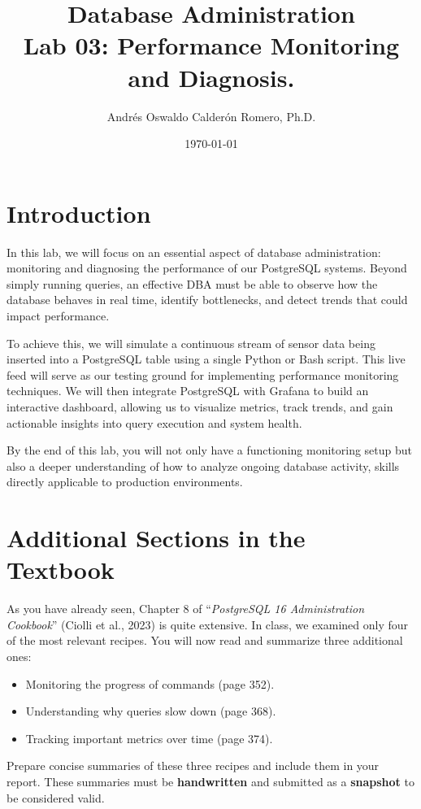 \documentclass{article}
\title{Database Administration \\ Lab 03: Performance Monitoring and Diagnosis.}
\author{Andrés Oswaldo Calderón Romero, Ph.D.}
\date{\today}
\begin{document}
\maketitle

\section{Introduction}
In this lab, we will focus on an essential aspect of database administration: monitoring and diagnosing the performance of our PostgreSQL systems. Beyond simply running queries, an effective DBA must be able to observe how the database behaves in real time, identify bottlenecks, and detect trends that could impact performance.

To achieve this, we will simulate a continuous stream of sensor data being inserted into a PostgreSQL table using a single Python or Bash script. This live feed will serve as our testing ground for implementing performance monitoring techniques. We will then integrate PostgreSQL with Grafana to build an interactive dashboard, allowing us to visualize metrics, track trends, and gain actionable insights into query execution and system health.

By the end of this lab, you will not only have a functioning monitoring setup but also a deeper understanding of how to analyze ongoing database activity, skills directly applicable to production environments.


\section{Additional Sections in the Textbook} \label{sec:recipes}
As you have already seen, Chapter 8 of ``\textit{PostgreSQL 16 Administration Cookbook}'' (Ciolli et al., 2023) is quite extensive. In class, we examined only four of the most relevant recipes. You will now read and summarize three additional ones:

\begin{itemize}
    \item Monitoring the progress of commands (page 352).
    \item Understanding why queries slow down (page 368).
    \item Tracking important metrics over time (page 374).
\end{itemize}

Prepare concise summaries of these three recipes and include them in your report. These summaries must be \textbf{handwritten} and submitted as a \textbf{snapshot} to be considered valid.
\end{document}
